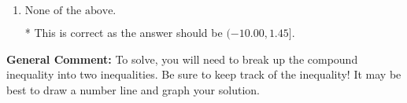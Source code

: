 \documentclass{extbook}[14pt]
\begin{document}
\begin{enumerate}
{\begin{enumerate}[label=\Alph*.]
$(-\infty, 10.00) \cup [-1.45, \infty)$, which corresponds to displaying the and-inequality as an or-inequality and getting negatives of the actual endpoints.
\item \( \text{None of the above.} \)

* This is correct as the answer should be $(-10.00, 1.45]$.
\end{enumerate}

\textbf{General Comment:} To solve, you will need to break up the compound inequality into two inequalities. Be sure to keep track of the inequality! It may be best to draw a number line and graph your solution.
}
\end{enumerate}
\end{document}
